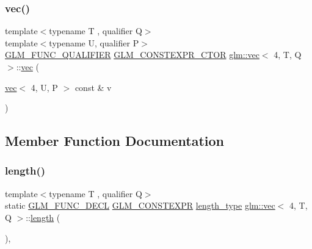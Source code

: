 \mbox{\label{structglm_1_1vec_3_014_00_01_t_00_01_q_01_4_a057f137a7b9cd18c6277dd4bc7f90335}} 
\subsubsection{\texorpdfstring{vec()}{vec()}\hspace{0.1cm}{\footnotesize\ttfamily [34/34]}}
{\footnotesize\ttfamily template$<$typename T , qualifier Q$>$ \\
template$<$typename U, qualifier P$>$ \\
\hyperlink{setup_8hpp_a33fdea6f91c5f834105f7415e2a64407}{G\+L\+M\+\_\+\+F\+U\+N\+C\+\_\+\+Q\+U\+A\+L\+I\+F\+I\+ER} \hyperlink{setup_8hpp_ad34178a09666081abdb573c14d1f4a5a}{G\+L\+M\+\_\+\+C\+O\+N\+S\+T\+E\+X\+P\+R\+\_\+\+C\+T\+OR} \hyperlink{structglm_1_1vec}{glm\+::vec}$<$ 4, T, Q $>$\+::\hyperlink{structglm_1_1vec}{vec} (\begin{DoxyParamCaption}\item[{\hyperlink{structglm_1_1vec}{vec}$<$ 4, U, P $>$ const \&}]{v }\end{DoxyParamCaption})}



\subsection{Member Function Documentation}
\mbox{\label{structglm_1_1vec_3_014_00_01_t_00_01_q_01_4_ac83fdb652378185c944b11f5cf35744d}} 
\subsubsection{\texorpdfstring{length()}{length()}}
{\footnotesize\ttfamily template$<$typename T , qualifier Q$>$ \\
static \hyperlink{setup_8hpp_ab2d052de21a70539923e9bcbf6e83a51}{G\+L\+M\+\_\+\+F\+U\+N\+C\+\_\+\+D\+E\+CL} \hyperlink{setup_8hpp_a08b807947b47031d3a511f03f89645ad}{G\+L\+M\+\_\+\+C\+O\+N\+S\+T\+E\+X\+PR} \hyperlink{structglm_1_1vec_3_014_00_01_t_00_01_q_01_4_af1c8f56963141951f4a4724b47e072d9}{length\+\_\+type} \hyperlink{structglm_1_1vec}{glm\+::vec}$<$ 4, T, Q $>$\+::\hyperlink{_s_d_l__opengl__glext_8h_ab9c919755bde3b34349e23a32b4e0fa7}{length} (\begin{DoxyParamCaption}{ }\end{DoxyParamCaption})\hspace{0.3cm}{\ttfamily [inline]}, {\ttfamily [static]}}

